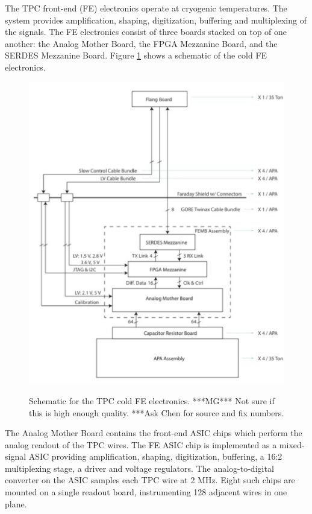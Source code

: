 

The TPC front-end (FE) electronics  operate at cryogenic temperatures. 
The system provides amplification, shaping,  digitization, buffering and
multiplexing of the signals. The FE electronics consist of three boards stacked on top of one another:  the Analog Mother Board, the FPGA Mezzanine Board, and the SERDES Mezzanine Board.  Figure \ref{fig:coldelec} shows a schematic of the cold FE electronics. 

\begin{figure}[tb]
  \centering
\includegraphics[scale=0.4]{figures/fe-electronics-block-diagram.pdf}
\label{fig:coldelec}
  \caption{Schematic for the TPC cold FE electronics. ***MG*** Not sure if this is high enough quality.  ***Ask Chen for source and fix numbers.  }
\end{figure}

The Analog Mother Board contains the front-end ASIC chips which perform the analog readout of the TPC wires.  The FE ASIC chip is implemented as a
mixed-signal ASIC providing amplification, shaping, digitization,
buffering, a 16:2 multiplexing stage, a driver and voltage regulators.  The analog-to-digital converter on the ASIC samples each TPC wire at 2 MHz.  Eight such chips 
are mounted on a single readout board, instrumenting 128 adjacent wires in one plane. 

